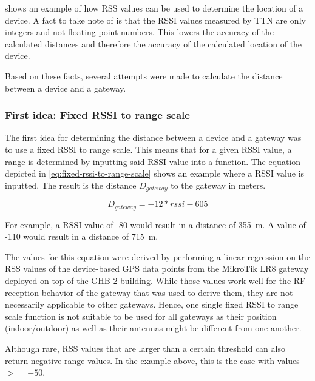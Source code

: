  shows an example of how \ac{RSS} values can be used to determine the location of a device.
A fact to take note of is that the \ac{RSSI} values measured by \ac{TTN} are only integers and not floating point numbers.
This lowers the accuracy of the calculated distances and therefore the accuracy of the calculated location of the device.

Based on these facts, several attempts were made to calculate the distance between a device and a gateway.

\subsubsection{First idea: Fixed \acs{RSSI} to range scale}\label{sec:fixed-rssi-to-range-scale}\label{sec:fixed-rssi-to-range-scale-impl}

The first idea for determining the distance between a device and a gateway was to use a fixed \ac{RSSI} to range scale.
This means that for a given \ac{RSSI} value, a range is determined by inputting said \ac{RSSI} value into a function.
The equation depicted in \cref{eq:fixed-rssi-to-range-scale} shows an example where a \ac{RSSI} value is inputted.
The result is the distance $D_{gateway}$ to the gateway in meters.

\begin{equation}\label{eq:fixed-rssi-to-range-scale}
    D_{gateway} = -12 * rssi - 605
\end{equation}

For example, a \ac{RSSI} value of -80 would result in a distance of \SI{355}{\meter}.
A value of -110 would result in a distance of \SI{715}{\meter}.

The values for this equation were derived by performing a linear regression on the \ac{RSS} values of the device-based GPS data points from the MikroTik LR8 gateway deployed on top of the \ac{GHB} 2 building.
While those values work well for the \ac{RF} reception behavior of the gateway that was used to derive them, they are not necessarily applicable to other gateways.
Hence, one single fixed \ac{RSSI} to range scale function is not suitable to be used for all gateways as their position (indoor/outdoor) as well as their antennas might be different from one another.

Although rare, \ac{RSS} values that are larger than a certain threshold can also return negative range values.
In the example above, this is the case with values $>= -50$.

